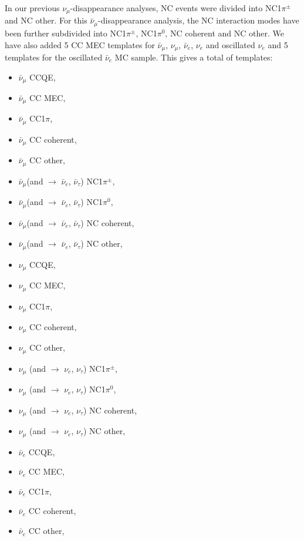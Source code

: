 In our previous $\nu_{\mu}$-disappearance analyses, NC events were divided into NC1$\pi^{\pm}$ and NC other. For this 
$\bar{\nu}_{\mu}$-disappearance analysis, the NC interaction modes have been further subdivided into NC1$\pi^{\pm}$, 
NC1$\pi^{0}$, NC coherent and NC other. We have also added 5 CC MEC templates for $\bar{\nu}_{\mu}$, $\nu_{\mu}$, $\bar{\nu}_{e}$, 
$\nu_{e}$ and oscillated $\nu_{e}$ and 5 templates for the oscillated $\bar{\nu}_{e}$ MC sample. This gives a 
total of \NMCTemplate{} templates: 
\begin{itemize}
\item  $\bar{\nu}_{\mu}$ CCQE,
\item  $\bar{\nu}_{\mu}$ CC MEC,
\item  $\bar{\nu}_{\mu}$ CC1$\pi$,
\item  $\bar{\nu}_{\mu}$ CC coherent,
\item  $\bar{\nu}_{\mu}$ CC other,
\item  $\bar{\nu}_{\mu}$(and $\rightarrow$ $\bar{\nu}_{e}$, $\bar{\nu}_{\tau}$) NC1$\pi^{\pm}$,
\item  $\bar{\nu}_{\mu}$(and $\rightarrow$ $\bar{\nu}_{e}$, $\bar{\nu}_{\tau}$) NC1$\pi^{0}$,
\item  $\bar{\nu}_{\mu}$(and $\rightarrow$ $\bar{\nu}_{e}$, $\bar{\nu}_{\tau}$) NC coherent,
\item  $\bar{\nu}_{\mu}$(and $\rightarrow$ $\bar{\nu}_{e}$, $\bar{\nu}_{\tau}$) NC other,
\item  $\nu_{\mu}$ CCQE,
\item  $\nu_{\mu}$ CC MEC,
\item  $\nu_{\mu}$ CC1$\pi$, 
\item  $\nu_{\mu}$ CC coherent, 
\item  $\nu_{\mu}$ CC other, 
\item  $\nu_{\mu}$ (and $\rightarrow$ $\nu_{e}$, $\nu_{\tau}$) NC1$\pi^{\pm}$, 
\item  $\nu_{\mu}$ (and $\rightarrow$ $\nu_{e}$, $\nu_{\tau}$) NC1$\pi^{0}$,
\item  $\nu_{\mu}$ (and $\rightarrow$ $\nu_{e}$, $\nu_{\tau}$) NC coherent,
\item  $\nu_{\mu}$ (and $\rightarrow$ $\nu_{e}$, $\nu_{\tau}$) NC other, 
\item  $\bar{\nu}_{e}$ CCQE,
\item  $\bar{\nu}_{e}$ CC MEC,
\item  $\bar{\nu}_{e}$ CC1$\pi$,
\item  $\bar{\nu}_{e}$ CC coherent,
\item  $\bar{\nu}_{e}$ CC other,

\end{itemize}
